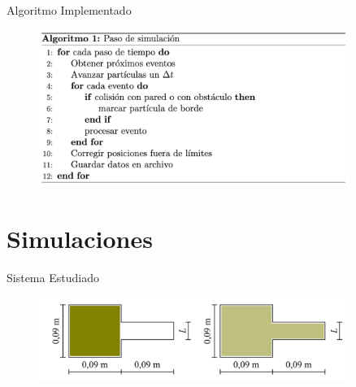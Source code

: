\documentclass{beamer}
\begin{document}
\begin{frame}{Algoritmo Implementado}
    \begin{figure}[htbp]
        \centering
        \includegraphics[width=0.9\textwidth]{resources/algorithm.png}
    \end{figure}
\end{frame}

\section{Simulaciones}

\begin{frame}{Sistema Estudiado}
    \begin{figure}[htbp]
        \centering
        \includegraphics[width=0.9\textwidth]{resources/system.png}
    \end{figure}
\end{frame}
\end{document}
